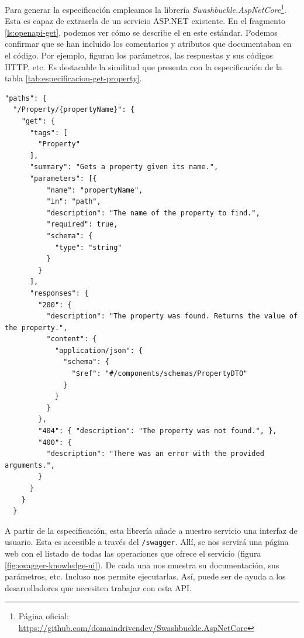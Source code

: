 
Para generar la especificación empleamos la librería \emph{Swashbuckle.AspNetCore}\footnote{Página oficial: \url{https://github.com/domaindrivendev/Swashbuckle.AspNetCore}}. Esta es capaz de extraerla de un servicio ASP.NET existente. En el fragmento \ref{ls:openapi-get}, podemos ver cómo se describe el  en este estándar. Podemos confirmar que se han incluido los comentarios y atributos que documentaban en el código. Por ejemplo, figuran los parámetros, las respuestas y sus códigos HTTP, etc. Es destacable la similitud que presenta con la especificación de la tabla \ref{tab:especificacion-get-property}.

\begin{lstlisting}[style=json,caption={Especificación OpenAPI del método para obtener una propiedad del conocimiento (\lstinline{GetProperty}). \protect\footnotemark},captionpos=b, label=ls:openapi-get]
"paths": {
  "/Property/{propertyName}": {
    "get": {
      "tags": [
        "Property"
      ],
      "summary": "Gets a property given its name.",
      "parameters": [{
          "name": "propertyName",
          "in": "path",
          "description": "The name of the property to find.",
          "required": true,
          "schema": {
            "type": "string"
          }
        }
      ],
      "responses": {
        "200": {
          "description": "The property was found. Returns the value of the property.",
          "content": {
            "application/json": {
              "schema": {
                "$ref": "#/components/schemas/PropertyDTO"
              }
            }
          }
        },
        "404": { "description": "The property was not found.", },
        "400": {
          "description": "There was an error with the provided arguments.",
        }
      }
    }
  }
\end{lstlisting}


A partir de la especificación, esta librería añade a nuestro servicio una interfaz de usuario. Esta es accesible a través del  \texttt{/swagger}. Allí, se nos servirá una página web con el listado de todas las operaciones que ofrece el servicio (figura \ref{fig:swagger-knowledge-ui}). De cada una nos muestra su documentación, sus parámetros, etc. Incluso nos permite ejecutarlas. Así, puede ser de ayuda a los desarrolladores que necesiten trabajar con esta API.

